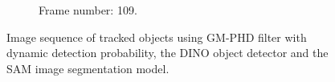 \begin{figure}[H]
\begin{subfigure}{0.48\textwidth}
        \caption{Frame number: 109.}
        \label{fig:E1-V2-S3:06}
    \end{subfigure}
    \caption{Image sequence of tracked objects using GM-PHD filter with dynamic detection probability, the DINO object detector and the SAM image segmentation model.}
    \label{fig:E1-V2-S3}
\end{figure}
